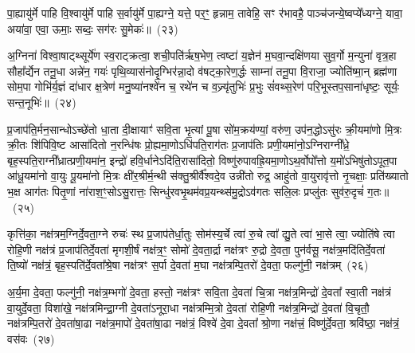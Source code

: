 पा॒ह्यायु॑र्मे पाहि वि॒श्वायु॑र्मे पाहि स॒र्वायु॑र्मे पा॒ह्यग्ने॒ यत्ते॒ पर॒ꣳ॒ हृन्नाम॒ तावेहि॒ सꣳ र॑भावहै॒ पाञ्च॑जन्ये॒ष्वप्ये᳚ध्यग्ने॒ यावा॒ अया॑वा॒ एवा॒ ऊमाः॒ सब्दः॒ सग॑रः सु॒मेकः॑॥~(२३)

{\anuvakamend[{व्या॒नम्मे॒ द्वात्रिꣳ॑शच्च}]}%

अ॒ग्निना॑ विश्वा॒षाट्थ्सूर्ये॑ण स्व॒राट्क्रत्वा॒ शची॒पति॑र्\mbox{}ऋष॒भेण॒ त्वष्टा॑ य॒ज्ञेन॑ म॒घवा॒न्दक्षि॑णया सुव॒र्गो म॒न्युना॑ वृत्र॒हा सौहा᳚र्द्येन तनू॒धा अन्ने॑न॒ गयः॑ पृथि॒व्यास॑नोदृ॒ग्भिर॑न्ना॒दो व॑षट्का॒रेण॒र्द्धः साम्ना॑ तनू॒पा वि॒राजा॒ ज्योति॑ष्मा॒न् ब्रह्म॑णा सोम॒पा गोभि॑र्य॒ज्ञं दा॑धार क्ष॒त्रेण॑ मनु॒ष्या॑नश्वे॑न च॒ रथे॑न च व॒ज्र्यृ॑तुभिः॑ प्र॒भुः सं॑वथ्स॒रेण॑ परि॒भूस्तप॒साना॑धृष्टः॒ सूर्यः॒ सन्त॒नूभिः॑॥~(२४)

{\anuvakamend[{अ॒ग्निनैका॒न्नप॑ञ्चा॒शत्}]}%

प्र॒जा\-प॑ति॒र्मन॒सान्धो\-ऽच्छे॑तो धा॒ता दी॒क्षायाꣳ॑ सवि॒ता भृ॒त्यां पू॒षा सो॑म॒क्रय॑ण्यां॒ वरु॑ण॒ उप॑न॒द्धो\-ऽसु॑रः क्री॒यमा॑णो मि॒त्रः क्री॒तः शि॑पिवि॒ष्ट आसा॑दितो न॒रन्धि॑षः प्रो॒ह्यमा॒णो\-ऽधि॑पति॒राग॑तः प्र॒जा\-प॑तिः प्रणी॒यमा॑नो॒\-ऽग्निराग्नी᳚ध्रे॒ बृह॒स्पति॒राग्नी᳚ध्रात्प्रणी॒यमा॑न॒ इन्द्रो॑ हवि॒र्धाने\-ऽदि॑ति॒रासा॑दितो॒ विष्णु॑रुपावह्रि॒यमा॒णो\-ऽथ॒र्वोपो᳚त्तो य॒मो॑\-ऽभिषु॑तो\-ऽपूत॒पा आ॑धू॒यमा॑नो वा॒युः पू॒यमा॑नो मि॒त्रः क्षी॑र॒श्रीर्म॒न्थी स॑क्तु॒श्रीर्वै᳚श्वदे॒व उन्नी॑तो रुद्र॒ आहु॑तो वा॒युरावृ॑त्तो नृ॒चक्षाः॒ प्रति॑ख्यातो भ॒क्ष आग॑तः पितृ॒णां ना॑राश॒ꣳ॒सो\-ऽसु॒रात्तः॒ सिन्धु॑रवभृ॒थम॑वप्र॒यन्थ्स॑मु॒द्रो\-ऽव॑गतः सलि॒लः प्रप्लु॑तः सुव॑रु॒दृचं॑ ग॒तः॥~(२५)

{\anuvakamend[{रु॒द्र एक॑विꣳशतिश्च}]}%

कृत्ति॑का॒ नक्ष॑त्रम॒ग्निर्दे॒वता॒ग्ने रुचः॑ स्थ प्र॒जाप॑तेर्धा॒तुः सोम॑स्य॒र्चे त्वा॑ रु॒चे त्वा᳚ द्यु॒ते त्वा॑ भा॒से त्वा॒ ज्योति॑षे त्वा रोहि॒णी नक्ष॑त्रं प्र॒जा\-प॑तिर्दे॒वता॑ मृगशी॒र्\mbox{}षं नक्ष॑त्र॒ꣳ॒ सोमो॑ दे॒वता॒र्द्रा नक्ष॑त्रꣳ रु॒द्रो दे॒वता॒ पुन॑र्वसू॒ नक्ष॑त्र॒मदि॑ति\-र्दे॒वता॑ ति॒ष्यो॑ नक्ष॑त्रं॒ बृह॒स्पति॑र्दे॒वता᳚श्रे॒षा नक्ष॑त्रꣳ स॒र्पा दे॒वता॑ म॒घा नक्ष॑त्रम्पि॒तरो॑ दे॒वता॒ फल्गु॑नी॒ नक्ष॑त्रम्~(२६)

अ॒र्य॒मा दे॒वता॒ फल्गु॑नी॒ नक्ष॑त्र॒म्भगो॑ दे॒वता॒ हस्तो॒ नक्ष॑त्रꣳ सवि॒ता दे॒वता॑ चि॒त्रा नक्ष॑त्र॒मिन्द्रो॑ दे॒वता᳚ स्वा॒ती नक्ष॑त्रं वा॒युर्दे॒वता॒ विशा॑खे॒ नक्ष॑त्रमिन्द्रा॒ग्नी दे॒वता॑\-ऽनूरा॒धा नक्ष॑त्रम्मि॒त्रो दे॒वता॑ रोहि॒णी नक्ष॑त्र॒मिन्द्रो॑ दे॒वता॑ वि॒चृतौ॒ नक्ष॑त्रम्पि॒तरो॑ दे॒वता॑षा॒ढा नक्ष॑त्र॒मापो॑ दे॒वता॑षा॒ढा नक्ष॑त्रं॒ विश्वे॑ दे॒वा दे॒वता᳚ श्रो॒णा नक्ष॑त्त्रं॒ विष्णु॑र्दे॒वता॒ श्रवि॑ष्ठा॒ नक्ष॑त्रं॒ वस॑वः~(२७)

